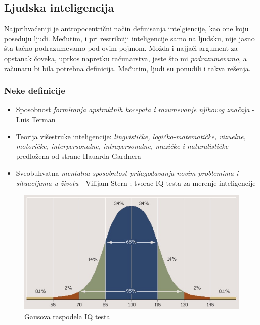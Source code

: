 \documentclass[a4paper]{article}
\begin{document}
\subsection{Ljudska inteligencija}
\label{potpoglavlje:uopsteno}
Najprihvaćeniji je antropocentrični način definisanja intelgiencije, kao one koju poseduju ljudi. Međutim, i pri restrikciji inteligencije samo na ljudsku, nije jasno šta tačno podrazumevamo pod ovim pojmom. Možda i najjači argument za opstanak čoveka, uprkos napretku računarstva, jeste što mi \emph{podrazumevamo}, a računaru bi bila potrebna definicija. Međutim, ljudi su ponudili i takva rešenja.

\subsubsection*{Neke definicije}
\label{ljudskaInt:definicije}
\begin{itemize}
    \item Sposobnost \textit{formiranja apstraktnih kocepata i razumevanje njihovog značaja} - Luis Terman \cite{terman}
    \item Teorija višestruke inteligencije: \textit{lingvističke, logičko-matematičke, vizuelne, motoričke, interpersonalne, intrapersonalne,  muzičke i naturalističke} predložena od strane Hauarda Gardnera \cite{Gardner1993-ps}
    \item Sveobuhvatna \textit{mentalna sposobntost prilagođavanja novim problemima i situacijama u životu} - Vilijam Stern \cite{stern}; tvorac IQ testa za merenje inteligencije
\end{itemize}
\begin{figure}[h!]
\begin{center}
\includegraphics[scale=0.3]{IQ.jpg}
\end{center}
\caption{Gausova raspodela IQ testa}
\label{fig:iqSlika}
\end{figure}
\end{document}
